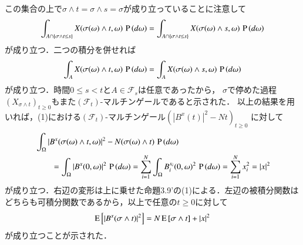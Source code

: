 \begin{prf}
\begin{description}
		この集合の上で$\sigma \wedge t = \sigma \wedge s = \sigma$が成り立っていることに注意して
		\begin{align}
			\int_{A \cap \{ \sigma \wedge t \leq s \}} X(\sigma(\omega) \wedge t, \omega)\, \operatorname{P} \left(d\omega\right)
			= \int_{A \cap \{ \sigma \wedge t \leq s \}} X(\sigma(\omega) \wedge s, \omega)\, \operatorname{P} \left(d\omega\right)
		\end{align}
		が成り立つ．二つの積分を併せれば
		\begin{align}
			\int_{A} X(\sigma(\omega) \wedge t, \omega)\, \operatorname{P} \left(d\omega\right)
			= \int_{A} X(\sigma(\omega) \wedge s, \omega)\, \operatorname{P} \left(d\omega\right)
		\end{align}
		が成り立つ．時間$0 \leq s < t$と$A \in \mathcal{F}_s$は任意であったから，
		$\sigma$で停めた過程$(X_{\sigma \wedge t})_{t \geq 0}$もまた$(\mathcal{F}_t)$-マルチンゲールであると示された．
		以上の結果を用いれば，(1)における$(\mathcal{F}_t)$-マルチンゲール$\left(|B^x(t)|^2 - Nt\right)_{t \geq 0}$
		に対して
		\begin{align}
			&\int_{\Omega} |B^x(\sigma(\omega) \wedge t,\omega)|^2 - N(\sigma(\omega) \wedge t)\, \operatorname{P} \left(d\omega\right) \\
			&\qquad= \int_{\Omega} |B^x(0,\omega)|^2\, \operatorname{P} \left(d\omega\right)
			= \sum_{i=1}^{N} \int_{\Omega} B_i^{x_i}(0,\omega)^2\, \operatorname{P} \left(d\omega\right)
			= \sum_{i=1}^{N} x_i^2
			= |x|^2
		\end{align}
		が成り立つ．右辺の変形は上に乗せた命題3.9'の(1)による．左辺の被積分関数はどちらも可積分関数であるから，以上で任意の$t \geq 0$に対して
		\begin{align}
			\operatorname{E} \left[ |B^x(\sigma \wedge t)|^2 \right] = N\operatorname{E} \left[ \sigma \wedge t \right] + |x|^2
		\end{align}
		が成り立つことが示された．
		

\end{description}
\end{prf}
